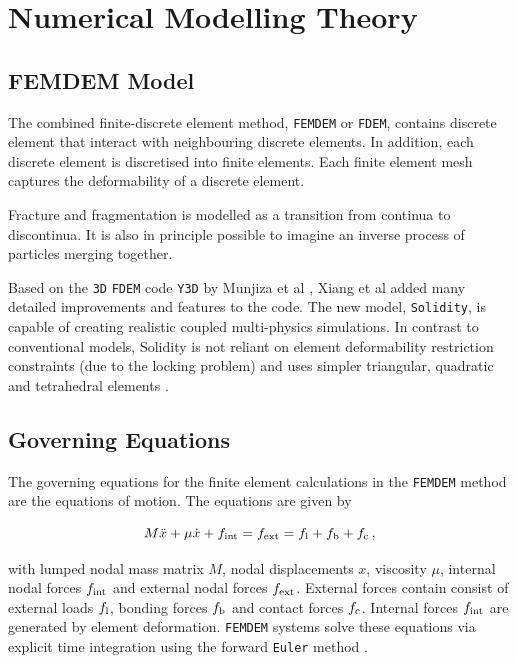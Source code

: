 \section{Numerical Modelling Theory}
\label{sec:NumericsTheory}

\subsection{FEMDEM Model}
The combined finite-discrete element method, \texttt{FEMDEM} or \texttt{FDEM}\cite{Wan18, Mun95, Mun99, Mun04, Mun12, Mun13, Guo16, Gao14, Xu14, Che18, Mun13}, contains discrete element that interact with neighbouring discrete elements. In addition, each discrete element is discretised into finite elements. Each finite element mesh captures the deformability of a discrete element. 

\bigbreak
Fracture and fragmentation is modelled as a transition from continua to discontinua. It is also in principle possible to imagine an inverse process of particles merging together.\cite{Mun04}

\bigbreak
Based on the \texttt{3D} \texttt{FDEM} code \texttt{Y3D} by Munjiza et al \cite{Mun95, Mun99, Mun04}, Xiang et al \cite{Xia09} added many detailed improvements and features to the code. The new model, \texttt{Solidity}, is capable of creating realistic coupled multi-physics simulations. In contrast to conventional models, Solidity is not reliant on element deformability restriction constraints (due to the locking problem) and uses simpler triangular, quadratic and tetrahedral elements \cite{Lat15}. 

\subsection{Governing Equations}

The governing equations for the finite element calculations in the \texttt{FEMDEM} method are the equations of motion. The equations are given by

\begin{equation}
    M\ddot{x}+\mu\dot{x}+f_{\rm{int}}=f_{\rm{ext}}=f_{\rm{l}}+f_{\rm{b}}+f_{\rm{c}}\,,
\end{equation}

with lumped nodal mass matrix $M$, nodal displacements $x$, viscosity $\mu$, internal nodal forces $f_{\rm{int}}$ and external nodal forces $f_{\rm{ext}}$. External forces contain consist of external loads $f_{\rm{l}}$, bonding forces $f_{\rm{b}}$ and contact forces $f_{\rm{c}}$. Internal forces $f_{\rm{int}}$ are generated by element deformation. \texttt{FEMDEM} systems solve these equations via explicit time integration using the forward \texttt{Euler} method \cite{Lei16}.

